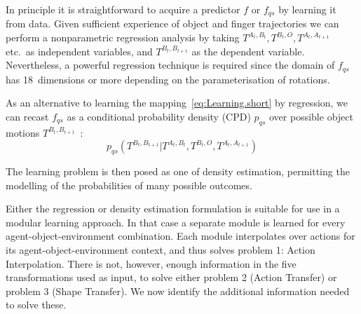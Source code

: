  In principle it is straightforward to acquire a predictor $f$ or
$f_{qs}$ by learning it from data. Given sufficient experience of
object and finger trajectories we can perform a nonparametric
regression analysis by taking $T^{A_t, B_t}, T^{B_t, O}, T^{A_{t},
  A_{t+1}}$ etc.\ as independent variables, and $T^{B_{t}, B_{t+1}}$
as the dependent variable.  Nevertheless, a powerful regression
technique is required since the domain of $f_{qs}$ has 18~dimensions
or more depending on the parameterisation of rotations.

 As an alternative to learning the mapping~\eqref{eq:Learning.short} by regression, we can recast $f_{qs}$ as a conditional probability density (CPD) $p_{qs}$ over possible object motions $T^{B_{t},B_{t+1}}$~\cite{kopicki_prediction_2009}:
\begin{equation}
p_{qs}(T^{B_{t}, B_{t+1}} | T^{A_t, B_t}, T^{B_t, O}, T^{A_{t}, A_{t+1}})
\end{equation}

The learning problem is then posed as one of density estimation, permitting the modelling of the probabilities of many possible outcomes. 

Either the regression or density estimation formulation is suitable for use in a modular learning approach. In that case a separate module is learned for every agent-object-environment combination. Each module interpolates over actions for its agent-object-environment context, and thus solves problem 1: Action Interpolation. There is not, however, enough information in the five transformations used as input, to solve either problem 2 (Action Transfer) or problem 3 (Shape Transfer). We now identify the additional information needed to solve these.





